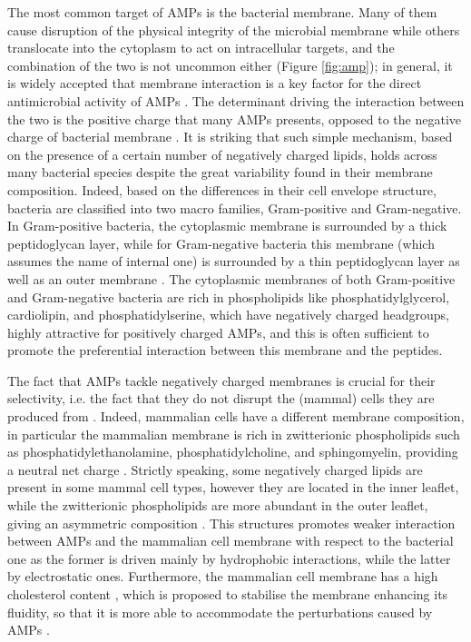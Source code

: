 The most common target of AMPs is the bacterial membrane. Many of them cause disruption of the physical integrity of the microbial membrane while others translocate into the cytoplasm to act on intracellular targets, and the combination of the two is not uncommon either \cite{Hancock2006} (Figure \ref{fig:amp}); in general, it is widely accepted that membrane interaction is a key factor for the direct antimicrobial activity of AMPs \cite{Nguyen2011,Malmsten2016}.
%
The determinant driving the interaction between the two is the positive charge that many AMPs presents, opposed to the negative charge of bacterial membrane \cite{Zhang2001,Schmitt2016}.
%
It is striking that such simple mechanism, based on the presence of a certain number of negatively charged lipids, holds across many bacterial species despite the great variability found in their membrane composition.
%
Indeed, based on the differences in their cell envelope structure, bacteria are classified into two macro families, Gram-positive and Gram-negative. In Gram-positive bacteria, the cytoplasmic membrane is surrounded by a thick peptidoglycan layer, while for Gram-negative bacteria this membrane (which assumes the name of internal one) is surrounded by a thin peptidoglycan layer as well as an outer membrane \cite{Lin2016}.
%
The cytoplasmic membranes of both Gram-positive and Gram-negative bacteria are rich in phospholipids like phosphatidylglycerol, cardiolipin, and phosphatidylserine, which have negatively charged headgroups, highly attractive for positively charged AMPs, and this is often sufficient to promote the preferential interaction between this membrane and the peptides.

The fact that AMPs tackle negatively charged membranes is crucial for their selectivity, i.e. the fact that they do not disrupt the (mammal) cells they are produced from \cite{Glukhov2005}. Indeed, mammalian cells have a different membrane composition, in particular the mammalian membrane is rich in zwitterionic phospholipids such as phosphatidylethanolamine, phosphatidylcholine, and sphingomyelin, providing a neutral net charge \cite{Spector1985,vanMeer2008}.
%
Strictly speaking, some negatively charged lipids are present in some mammal cell types, however they are located in the inner leaflet, while the zwitterionic phospholipids are more abundant in the outer leaflet, giving an asymmetric composition \cite{???}.
%
This structures promotes weaker interaction between AMPs and the mammalian cell membrane with respect to the bacterial one as the former is driven mainly by hydrophobic interactions, while the latter by electrostatic ones.
%
Furthermore, the mammalian cell membrane has a high cholesterol content \cite{Yeaman2003, Lai2009}, which is proposed to stabilise the membrane enhancing its fluidity, so that it is more able to accommodate the perturbations caused by AMPs \cite{Zasloff2002}.

